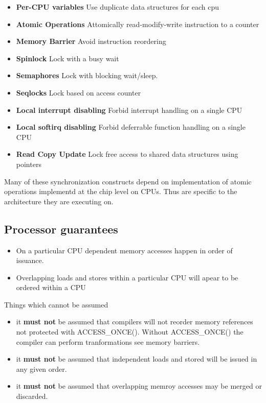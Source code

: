 \documentclass{article}
\begin{document}
\begin{itemize}
\item \textbf{Per-CPU variables}
  Use duplicate data structures for each cpu
\item \textbf{Atomic Operations}
  Attomically read-modify-write instruction to a counter
\item \textbf{Memory Barrier}
  Avoid instruction reordering
\item  \textbf{Spinlock}
  Lock with a busy wait
\item \textbf{Semaphores}
  Lock with blocking wait/sleep.
\item \textbf{Seqlocks}
  Lock based on access counter
\item \textbf{Local interrupt disabling}
  Forbid interrupt handling on a single CPU
\item \textbf{Local softirq disabling}
  Forbid deferrable function handling on a single CPU
\item \textbf{Read Copy Update}
  Lock free access to shared data structures using pointers
\end{itemize}

Many of these synchronization constructs depend on implementation of
atomic operations implementd at the chip level on CPUs. Thus are
specific to the architecture they are executing on.

\subsection{Processor guarantees}

\begin{itemize}
  \item On a particular CPU dependent memory accesses happen in order
    of issuance.

  \item Overlapping loads and stores within a particular CPU will
    apear to be ordered within a CPU
    
\end{itemize}

Things which cannot be assumed

\begin{itemize}
\item it \textbf{must not} be assumed that compilers will not reorder
  memory references not protected with ACCESS\_ONCE(). Without
  ACCESS\_ONCE() the compiler can perform tranformations see memory
  barriers.
\item it \textbf{must not} be assumed that independent loads and
  stored will be issued in any given order.
\item it \textbf{must not} be assumed that overlapping memroy accesses
  may be merged or discarded.  
\end{itemize}
\end{document}
